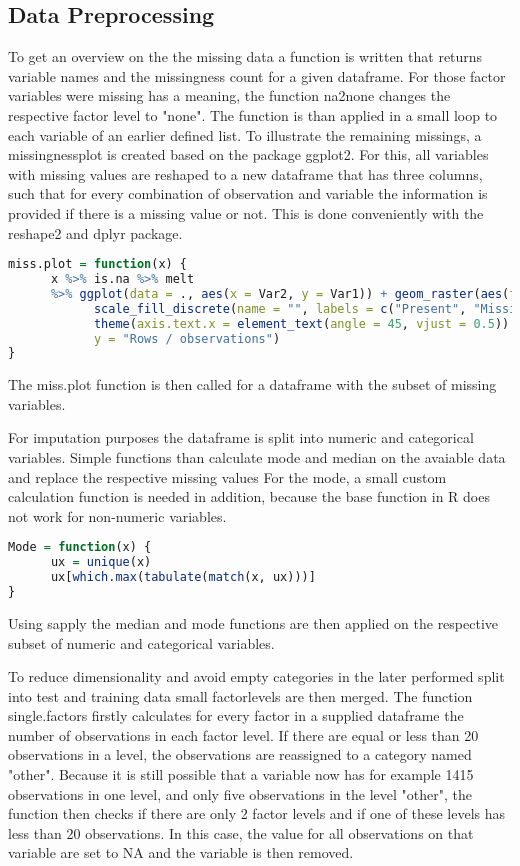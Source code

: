 \subsection{Data Preprocessing}

To  get an overview on the  the missing data a function is written that returns variable names and the missingness count for a given dataframe. 
For those factor variables were missing has a meaning, the function na2none changes the respective factor level to "none". 
The function is than applied in a small loop to each variable of an earlier defined list. 
To illustrate the remaining missings, a  missingnessplot  is created based on the package ggplot2. For this, all variables with missing values are reshaped to a new dataframe that has three columns, such that for every combination of observation and variable the information is provided if there is a missing value or not. This is done conveniently with the reshape2 and dplyr package.  

\begin{lstlisting}[language=R]
miss.plot = function(x) {
      x %>% is.na %>% melt 
      %>% ggplot(data = ., aes(x = Var2, y = Var1)) + geom_raster(aes(fill = value)) + 
            scale_fill_discrete(name = "", labels = c("Present", "Missing")) + theme_classic() + 
            theme(axis.text.x = element_text(angle = 45, vjust = 0.5)) + labs(x = "Variables in Dataset", 
            y = "Rows / observations")
}
\end{lstlisting}

The miss.plot function is then called  for  a dataframe with the subset of missing  variables. 

For imputation purposes the dataframe is split into numeric and categorical variables. 
Simple functions than calculate mode and median on the avaiable data and replace the respective missing values
For the mode, a small custom calculation function is needed in addition, because the base function in R does not work for non-numeric variables. 
\begin{lstlisting}[language=R]
Mode = function(x) {
      ux = unique(x)
      ux[which.max(tabulate(match(x, ux)))]
}
\end{lstlisting}
Using sapply the median and mode functions are then applied on the respective subset of numeric and categorical variables. 

To reduce dimensionality and avoid empty categories in the later performed split into test and training data small factorlevels are then merged. The function single.factors firstly calculates for every factor in a supplied dataframe the number of observations in each factor level. If there are equal or less than 20 observations in a level, the observations are reassigned to a category named "other". 
Because it is still possible that a variable now has for example 1415 observations in one level, and only five observations in the level "other", the function then checks if there are only 2 factor levels and if one of these levels has less than 20 observations. In this case, the value for all observations on that variable are set to NA and the variable is then removed.

